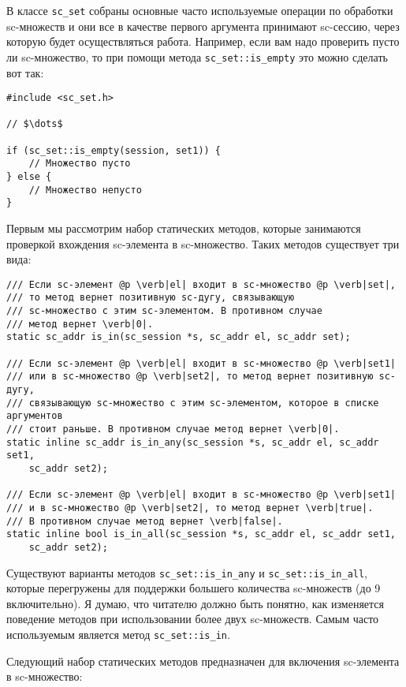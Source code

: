 В классе \lstinline|sc_set| собраны основные часто используемые операции по
обработки sc-множеств и они все в качестве первого аргумента принимают
sc-сессию, через которую будет осуществляться работа. Например, если
вам надо проверить пусто ли sc-множество, то при помощи метода
\lstinline|sc_set::is_empty| это можно сделать вот так:

\begin{lstlisting}[texcl]
#include <sc_set.h>

// $\dots$

if (sc_set::is_empty(session, set1)) {
    // Множество пусто
} else {
    // Множество непусто
}
\end{lstlisting}

Первым мы рассмотрим набор статических методов, которые занимаются
проверкой вхождения sc-элемента в sc-множество. Таких методов
существует три вида:

\begin{lstlisting}[texcl]
/// Если sc-элемент @p \verb|el| входит в sc-множество @p \verb|set|,
/// то метод вернет позитивную sc-дугу, связывающую
/// sc-множество с этим sc-элементом. В противном случае
/// метод вернет \verb|0|.
static sc_addr is_in(sc_session *s, sc_addr el, sc_addr set);

/// Если sc-элемент @p \verb|el| входит в sc-множество @p \verb|set1|
/// или в sc-множество @p \verb|set2|, то метод вернет позитивную sc-дугу,
/// связывающую sc-множество с этим sc-элементом, которое в списке аргументов
/// стоит раньше. В противном случае метод вернет \verb|0|.
static inline sc_addr is_in_any(sc_session *s, sc_addr el, sc_addr set1,
    sc_addr set2);

/// Если sc-элемент @p \verb|el| входит в sc-множество @p \verb|set1|
/// и в sc-множество @p \verb|set2|, то метод вернет \verb|true|.
/// В противном случае метод вернет \verb|false|.
static inline bool is_in_all(sc_session *s, sc_addr el, sc_addr set1,
    sc_addr set2);
\end{lstlisting}

Существуют варианты методов \lstinline|sc_set::is_in_any| и
\lstinline|sc_set::is_in_all|, которые перегружены для поддержки
большего количества sc-множеств (до 9 включительно). Я думаю, что
читателю должно быть понятно, как изменяется поведение методов при
использовании более двух sc-множеств. Самым часто используемым
является метод \lstinline|sc_set::is_in|.

Следующий набор статических методов предназначен для включения
sc-элемента в sc-множество:


